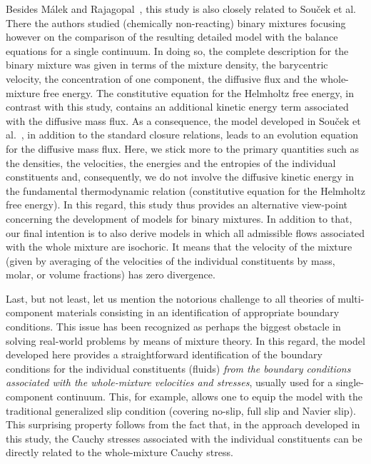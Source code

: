 \documentclass[a4paper]{article}
\begin{document}
Besides M\'{a}lek and Rajagopal~\cite{malek-2008}, this study is also closely related to Sou\v{c}ek et al.~\cite{soucek-et-al-2014} There the authors studied (chemically non-reacting) binary mixtures focusing however on the comparison of the resulting detailed model with the balance equations for a single continuum. In doing so, the complete description for the binary mixture was given in terms of the mixture density, the barycentric velocity, the concentration of one component, the diffusive flux and the whole-mixture free energy. The constitutive equation for the Helmholtz free energy, in contrast with this study, contains an additional kinetic energy term associated with the diffusive mass flux. As a consequence, the model developed in Sou\v{c}ek et al.~\cite{soucek-et-al-2014}, in addition to the standard closure relations, leads to an evolution equation for the diffusive mass flux. Here, we stick more to the primary quantities such as the densities, the velocities, the energies and the entropies of the individual constituents and, consequently, we do not involve the diffusive kinetic energy in the fundamental thermodynamic relation (constitutive equation for the Helmholtz free energy). In this regard, this study thus provides an alternative view-point concerning the development of models for binary mixtures. 
In addition to that, our final intention is to also derive models in which all admissible flows associated with the whole mixture are isochoric. It means that the velocity of the mixture (given by averaging of the velocities of the individual constituents  by mass, molar, or volume fractions) has zero divergence. 


Last, but not least, let us mention the notorious challenge to all theories of multi-component materials consisting in an identification of appropriate boundary conditions. This issue has been recognized as perhaps the biggest obstacle in solving real-world problems by means of mixture theory\cite{Rajagopal-and-Tao-1995}. In this regard, the model developed here provides a straightforward identification of the boundary conditions for the individual constituents (fluids) {\it from the boundary conditions associated with the whole-mixture velocities and stresses}, usually used for a single-component continuum. This, for example, allows one to equip the model with the traditional generalized slip condition (covering no-slip, full slip and Navier slip). This surprising property  follows from the fact that, in the approach developed in this study, the Cauchy stresses associated with the individual constituents can be directly related to the whole-mixture Cauchy stress. 
\end{document}
